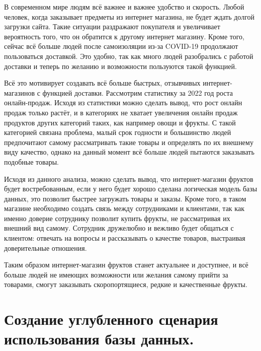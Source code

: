\documentclass[14pt]{extreport}
\begin{document}
\pagestyle{empty} %


\setcounter{page}{1}
\tableofcontents

\intro
\pagestyle{plain} %

В современном мире людям всё важнее и важнее удобство и скорость. Любой человек, когда заказывает предметы из интернет магазина, не будет ждать долгой загрузки сайта. Такие ситуации раздражают покупателя и увеличивает вероятность того, что он обратится к другому интернет магазину.
Кроме того, сейчас всё больше людей после самоизоляции из-за COVID-19 продолжают пользоваться доставкой. Это удобно, так как много людей разобрались с работой доставки и теперь по желанию и возможности пользуются такой функцией. 

Всё это мотивирует создавать всё больше быстрых, отзывчивых интернет-магазинов с функцией доставки. Рассмотрим статистику за 2022 год роста онлайн-продаж. Исходя из статистики можно сделать вывод, что рост онлайн продаж только растёт, и в категориях не хватает увеличения онлайн продаж продуктов других категорий таких, как например овощи и фрукты. С такой категорией связана проблема, малый срок годности и большинство людей предпочитают самому рассматривать такие товары и определять по их внешнему виду качество, однако на данный момент всё больше людей пытаются заказывать подобные товары.

Исходя из данного анализа, можно сделать вывод, что интернет-магазин фруктов будет востребованным, если у него будет хорошо сделана логическая модель базы данных, это позволит быстрее загружать товары и заказы. Кроме того, в таком магазине необходимо создать связь между сотрудниками и клиентами, так как именно доверие сотруднику позволит купить фрукты, не рассматривая их внешний вид самому. Сотрудник дружелюбно и вежливо будет общаться с клиентом: отвечать на вопросы и рассказывать о качестве товаров, выстраивая доверительные отношения.

Таким образом интернет-магазин фруктов станет актуальнее и доступнее, и всё больше людей не имеющих возможности или желания самому прийти за товарами, смогут заказывать скоропортящиеся, редкие и качественные фрукты.




\chapter{Создание углубленного сценария использования базы данных.}
\end{document}
